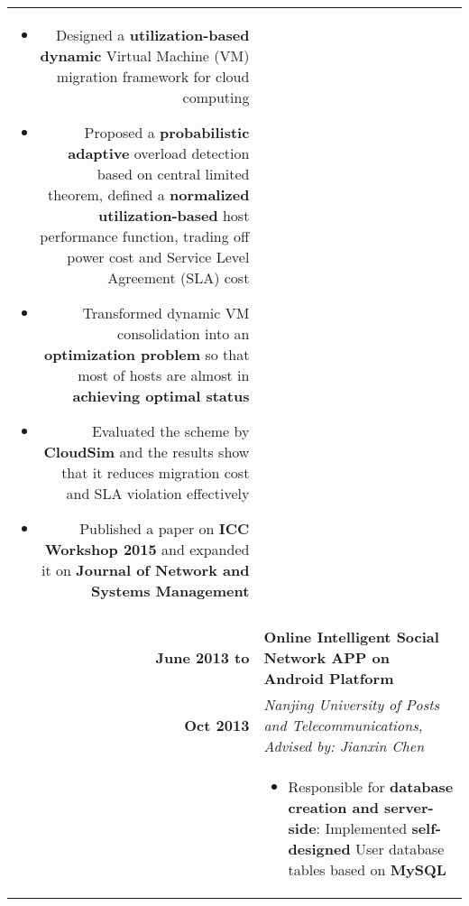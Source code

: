 \documentclass[a4paper, 10pt]{extarticle} %
\begin{document}
\begin{CJK*}{GBK}{song}
\begin{longtable}{r | p{15cm}}
{\begin{itemize}[leftmargin=*]
\item Designed a \textbf{utilization-based dynamic} Virtual Machine (VM) migration framework for cloud computing

\item Proposed a \textbf{probabilistic adaptive} overload detection based on central limited theorem, defined a \textbf{normalized utilization-based} host performance function, trading off power cost and Service Level Agreement (SLA) cost
\item Transformed dynamic VM consolidation into an \textbf{optimization problem} so that most of hosts are almost in \textbf{achieving optimal status}

\item Evaluated the scheme by \textbf{CloudSim} and the results show that it reduces migration cost and SLA violation effectively

\item Published a paper on \textbf{ICC Workshop 2015} and expanded it on \textbf{Journal of Network and Systems Management}

\vspace{-0.3cm}

\end{itemize}

}

\\


\multicolumn{2}{c}{} \\
			\textbf{June 2013 to}
		
		 &
		
		 \textbf{Online Intelligent Social Network APP on Android Platform}  \\
		
			\textbf{Oct 2013}
		
		& \footnotesize{

\vspace{-0.3cm}\textit{Nanjing University of Posts and Telecommunications, Advised by: Jianxin Chen}}
\\
		
&

\footnotesize{

\vspace{-0.3cm}

\begin{itemize}[leftmargin=*]
\item Responsible for \textbf{database creation and server-side}: Implemented \textbf{self-designed} User database tables based on \textbf{MySQL}


\end{itemize}}
\end{longtable}
\end{CJK*}
\end{document}
